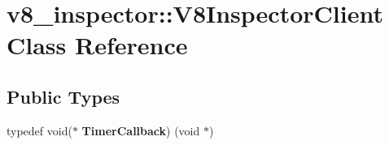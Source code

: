 \hypertarget{classv8__inspector_1_1V8InspectorClient}{}\section{v8\+\_\+inspector\+:\+:V8\+Inspector\+Client Class Reference}
\label{classv8__inspector_1_1V8InspectorClient}
\subsection*{Public Types}
\begin{DoxyCompactItemize}
\item 
\mbox{\label{classv8__inspector_1_1V8InspectorClient_afe9f10304f06f11284ecf8c0d8a3df78}} 
typedef void($\ast$ {\bfseries Timer\+Callback}) (void $\ast$)
\end{DoxyCompactItemize}
